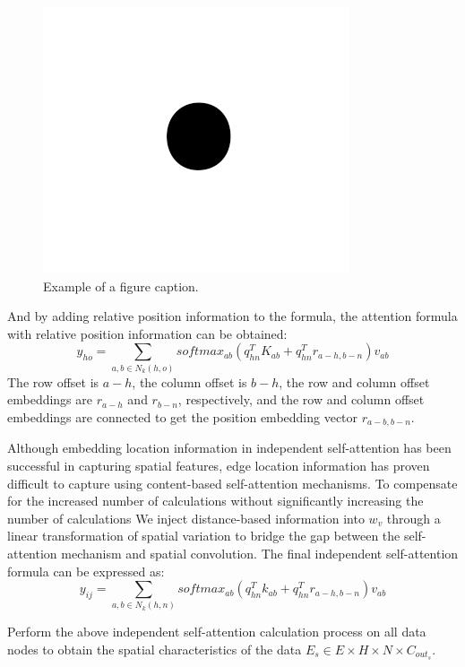 \documentclass[conference]{IEEEtran}
\begin{document}
\begin{figure}[htbp]
    \centerline{\includegraphics{fig1.png}}
    \caption{Example of a figure caption.}
    \label{fig}
\end{figure}
And by adding relative position information to the formula, the attention formula with relative position information can be obtained:
\begin{equation}
    y_{ho} = \sum_{a,b \in N_k(h,o)} softmax_{ab}(q_{hn}^TK_{ab} + q_{hn}^Tr_{a-h,b-n})v_{ab}
\end{equation}
The row offset is $a-h$, the column offset is $b-h$, the row and column offset embeddings are $r_{a-h}$ and $r_{b-n}$, respectively, and the row and column offset embeddings are connected to get the position embedding vector $r_{a-b ,b-n}$.
\par
Although embedding location information in independent self-attention has been successful in capturing spatial features, edge location information has proven difficult to capture using content-based self-attention mechanisms. To compensate for the increased number of calculations without significantly increasing the number of calculations We inject distance-based information into $w_v$ through a linear transformation of spatial variation to bridge the gap between the self-attention mechanism and spatial convolution. The final independent self-attention formula can be expressed as:
\begin{equation}
    y_{ij} = \sum_{a,b \in N_k(h,n)} softmax_{ab}(q_{hn}^Tk_{ab} + q_{hn}^Tr_{a-h,b-n})v_{ab}
\end{equation}
\par
Perform the above independent self-attention calculation process on all data nodes to obtain the spatial characteristics of the data $E_s \in E \times H \times N \times C_{out_s}$.
\end{document}
